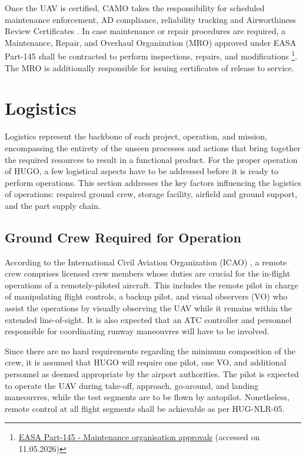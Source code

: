 Once the UAV is certified, CAMO takes the responsibility for scheduled maintenance enforcement, AD compliance, reliability tracking and Airworthiness Review Certificates \cite{EASA_CAirworthiness}. In case maintenance or repair procedures are required, a Maintenance, Repair, and Overhaul Organization (MRO) approved under EASA Part-145 shall be contracted to perform inspections, repairs, and modifications \footnote{\href{https://www.easa.europa.eu/en/acceptable-means-compliance-and-guidance-material-group/part-145-maintenance-organisation-approvals}{EASA Part-145 - Maintenance organisation approvals} (accessed on 11.05.2026)}. The MRO is additionally responsible for issuing certificates of release to service.





\section{Logistics}
\label{sec:logistics}
Logistics represent the backbone of each project, operation, and mission, encompassing the entirety of the unseen processes and actions that bring together the required resources to result in a functional product. For the proper operation of HUGO, a few logistical aspects have to be addressed before it is ready to perform operations. This section addresses the key factors influencing the logistics of operations: required ground crew, storage facility, airfield and ground support, and the part supply chain.

\subsection{Ground Crew Required for Operation}
\label{subsec:ground_crew}
According to the International Civil Aviation Organization (ICAO) \cite{ICAO2011UAS}, a remote crew comprises licensed crew members whose duties are crucial for the in-flight operations of a remotely-piloted aircraft. This includes the remote pilot in charge of manipulating flight controls, a backup pilot, and visual observers (VO) who assist the operations by visually observing the UAV while it remains within the extended line-of-sight. It is also expected that an ATC controller and personnel responsible for coordinating runway maneouvres will have to be involved. 

Since there are no hard requirements regarding the minimum composition of the crew, it is assumed that HUGO will require one pilot, one VO, and additional personnel as deemed appropriate by the airport authorities. The pilot is expected to operate the UAV during take-off, approach, go-around, and landing maneouvres, while the test segments are to be flown by autopilot. Nonetheless, remote control at all flight segments shall be achievable as per HUG-NLR-05.


